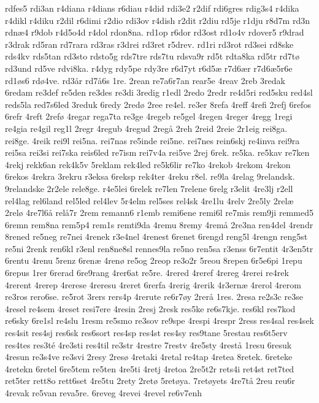 {rdfes5
rdi3an
r4diana
r4dians
r6diau
r4did
rdi3e2
r2dif
rdi6gres
rdig3s4
r4dika
r4dikl
r4diku
r2dil
r6dimi
r2dio
rdi3ov
r4dish
r2dit
r2diu
rd5je
r1dju
r8d7m
rd3n
rdnæ4
r9dob
r4d5o4d
r4dol
rdon8na.
rd1op
r6dor
rd3ost
rd1o4v
rdover5
r9drad
r3drak
rd5ran
rd7rara
rd3ras
r3drei
rd3ret
r5drev.
rd1ri
rd3rot
rd3sei
rd8ske
rds4kv
rds5tan
rd3sto
rdsto5g
rds7tre
rds7tu
rdsva9r
rd5t
rdta8ka
rd5tr
rd7tø
rd3und
rd5ve
rdvi8ka.
r4dyg
rdy5pe
rdy3re
r6d7yt
r6d5æ
r7d6ær
r7d6æ5r6e
rd1øs6
rdø4ve.
rd3år
rd7å6s
1re.
2rean
re7a6r7an
rear5e
4reav
2reb
3redak
6redam
re3def
re5den
re3des
re3di
3redig
r1edl
2redo
2redr
re4d5ri
red5sku
red4sl
reds5la
red7s6led
3reduk
6redy
2redø
2ree
re4el.
re3er
8refa
4reff
4refi
2refj
6refos
6refr
4reft
2refø
4regar
rega7ta
re3ge
4regeb
re5gel
4regen
4reger
4regg
1regi
re4gia
re4gil
reg1l
2regr
4regub
4regud
2regå
2reh
2reid
2reie
2r1eig
rei8ga.
rei8ge.
4reik
rei9l
rei5na.
rei7nas
re5inde
rei5ne.
rei7nes
rein6skj
re4inva
rei9ra
rei5sa
rei3si
rei7ska
reis6led
re7ism
rei7v4a
rei5ve
2rej
6rek.
re5ka.
re5kav
re7ken
4rekj
rekk6an
rek4k5v
5reklam
rek4led
re5k6lir
re7ko
4rekob
4rekom
4rekon
6rekos
4rekra
3rekru
r3eksa
6reksp
rek4ter
4reku
r8el.
re9la
4relag
9relandsk.
9relandske
2r2ele
rele8ge.
r4e5lei
6relek
re7len
7relene
6relg
r3elit
4re3lj
r2ell
rel4lag
rel6land
rel5led
rel4lev
5r4elm
rel5ses
rel4sk
4re1lu
4relv
2re5ly
2relæ
2relø
4re7l6å
relå7r
2rem
remann6
r1emb
remi6ene
remi6l
re7mis
rem9ji
remmed5
6remn
rem8na
rem5p4
rem1s
remti9da
4remu
8remy
4remå
2re3na
ren4del
4rendr
8rened
re5neg
re7nei
4renek
r3e4nel
4renest
6renet
6rengd
reng5l
4rengn
reng5st
re5ni
2renk
ren6kl
r3enl
ren8ne8sl
rennes9la
re5no
ren5sa
r3enss
6r7entit
4r3en5tr
6rentu
4renu
5renz
6renæ
4renø
re5og
2reop
re3o2r
5reou
8repen
6r5e6pi
1repu
6repus
1rer
6rerad
6re9rang
4rer6at
re5re.
4rered
4reref
4rereg
4rerei
re4rek
4rerent
4rerep
4rerese
4reresu
4reret
6rerfa
4rerig
4rerik
4r3ernæ
4rerol
4rerom
re3ros
rero6se.
re5rot
3rers
rers4p
4rerute
re6r7øy
2rerå
1res.
2resa
re2s3c
re3se
4resel
re4sem
4reset
resi7ere
4resin
2resj
2resk
res5ke
re6s7kje.
res6kl
res7kod
re6sky
6re1sl
re4slu
1resm
re5smo
re3sov
re9spe
4respi
4respr
2ress
res4sal
res4sek
res4sit
res4sj
res6sk
res6sort
res4sp
res4st
res4sy
res9tane
5restau
res6t5erv
res4tes
res3té
4re3sti
res4til
re3str
4restre
7restv
4re5sty
4restå
1resu
6resuk
4resun
re3s4ve
re3svi
2resy
2resø
4retaki
4retal
re4tap
4retea
8retek.
6reteke
4retekn
6retel
6re5tem
re5ten
4re5ti
4retj
4retoa
2re5t2r
rets4i
ret4st
ret7ted
ret5ter
rett8o
rett6set
4re5tu
2rety
2retø
5retøya.
7retøyets
4re7tå
2reu
reu6r
4revak
re5van
reva5re.
6reveg
4revei
4revel
re6v7enh
}
